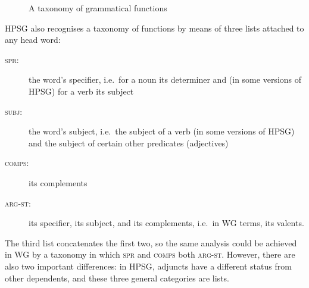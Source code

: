 \documentclass[output=paper
 	        ,biblatex
                ,babelshorthands
                ,newtxmath
                ,draftmode
                ,colorlinks, citecolor=brown
]{langscibook}
\begin{document}
\begin{figure}
	\centering
{}
	\caption{A taxonomy of grammatical functions}
	\label{fig:17}
\end{figure}

HPSG also recognises a taxonomy of functions by means of three lists attached to any head word:

\begin{description}
\item[\textnormal{\textsc{spr}:}] \label{it:spr} the word's specifier, i.e.\ for a noun its determiner and (in some versions of HPSG) for a verb its subject
	
\item[\textnormal{\textsc{subj}:}] \label{it:subj} the word's subject, i.e.\ the subject of a verb
  (in some versions of HPSG) and the subject of certain other predicates (\eguk adjectives)

\item[\textnormal{\textsc{comps}:}] \label{it:comps} its complements
	
\item[\textnormal{\textsc{arg-st}:}] \label{it:arg-st} its specifier, its subject, and its complements, i.e.\ in
  WG terms, its valents.
\end{description}

\noindent
The third list concatenates the first two, so the same analysis could be achieved in WG by a
taxonomy in which \textsc{spr} and \textsc{comps} both  \textsc{arg-st}. However, there are
also two important differences: in HPSG, adjuncts have a different status from other dependents, and
these three general categories are lists.
\end{document}
